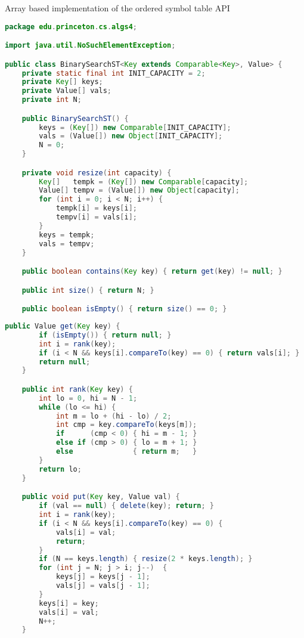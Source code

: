 \documentclass[8pt,a4paper,compress]{beamer}
\begin{document}
\begin{frame}[fragile]
\pause

Array based implementation of the ordered symbol table API

\smallskip

\begin{lstlisting}[language=Java,style=focusin]
package edu.princeton.cs.algs4;

import java.util.NoSuchElementException;

public class BinarySearchST<Key extends Comparable<Key>, Value> {
    private static final int INIT_CAPACITY = 2;
    private Key[] keys;
    private Value[] vals;
    private int N;

    public BinarySearchST() { 
        keys = (Key[]) new Comparable[INIT_CAPACITY]; 
        vals = (Value[]) new Object[INIT_CAPACITY]; 
        N = 0;
    }   

    private void resize(int capacity) {
        Key[]   tempk = (Key[]) new Comparable[capacity];
        Value[] tempv = (Value[]) new Object[capacity];
        for (int i = 0; i < N; i++) {
            tempk[i] = keys[i];
            tempv[i] = vals[i];
        }
        keys = tempk;
        vals = tempv;
    }

    public boolean contains(Key key) { return get(key) != null; }

    public int size() { return N; }

    public boolean isEmpty() { return size() == 0; }
\end{lstlisting}
\end{frame}

\begin{frame}[fragile]
\pause

\begin{lstlisting}[language=Java,style=focusin]
    public Value get(Key key) {
        if (isEmpty()) { return null; }
        int i = rank(key); 
        if (i < N && keys[i].compareTo(key) == 0) { return vals[i]; }
        return null;
    } 

    public int rank(Key key) {
        int lo = 0, hi = N - 1; 
        while (lo <= hi) { 
            int m = lo + (hi - lo) / 2; 
            int cmp = key.compareTo(keys[m]); 
            if      (cmp < 0) { hi = m - 1; }
            else if (cmp > 0) { lo = m + 1; } 
            else              { return m;   }
        } 
        return lo;
    } 

    public void put(Key key, Value val) {
        if (val == null) { delete(key); return; }
        int i = rank(key);
        if (i < N && keys[i].compareTo(key) == 0) {
            vals[i] = val;
            return;
        }
        if (N == keys.length) { resize(2 * keys.length); }
        for (int j = N; j > i; j--)  {
            keys[j] = keys[j - 1];
            vals[j] = vals[j - 1];
        }
        keys[i] = key;
        vals[i] = val;
        N++;
    } 
\end{lstlisting}
\end{frame}
\end{document}
